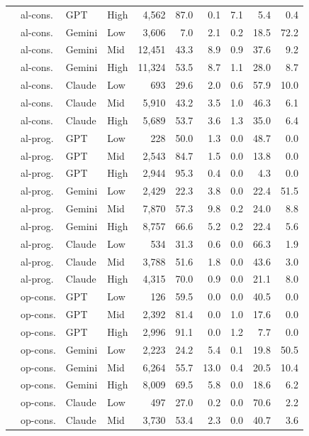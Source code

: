 \begin{table}[t]
\begin{tabular}{llllrrrrrr}
 & al-cons. & GPT & High & 4{,}562 & 87.0 & 0.1 & 7.1 & 5.4 & 0.4 \\
 & al-cons. & Gemini & Low & 3{,}606 & 7.0 & 2.1 & 0.2 & 18.5 & 72.2 \\
 & al-cons. & Gemini & Mid & 12{,}451 & 43.3 & 8.9 & 0.9 & 37.6 & 9.2 \\
 & al-cons. & Gemini & High & 11{,}324 & 53.5 & 8.7 & 1.1 & 28.0 & 8.7 \\
 & al-cons. & Claude & Low & 693 & 29.6 & 2.0 & 0.6 & 57.9 & 10.0 \\
 & al-cons. & Claude & Mid & 5{,}910 & 43.2 & 3.5 & 1.0 & 46.3 & 6.1 \\
 & al-cons. & Claude & High & 5{,}689 & 53.7 & 3.6 & 1.3 & 35.0 & 6.4 \\
 & al-prog. & GPT & Low & 228 & 50.0 & 1.3 & 0.0 & 48.7 & 0.0 \\
 & al-prog. & GPT & Mid & 2{,}543 & 84.7 & 1.5 & 0.0 & 13.8 & 0.0 \\
 & al-prog. & GPT & High & 2{,}944 & 95.3 & 0.4 & 0.0 & 4.3 & 0.0 \\
 & al-prog. & Gemini & Low & 2{,}429 & 22.3 & 3.8 & 0.0 & 22.4 & 51.5 \\
 & al-prog. & Gemini & Mid & 7{,}870 & 57.3 & 9.8 & 0.2 & 24.0 & 8.8 \\
 & al-prog. & Gemini & High & 8{,}757 & 66.6 & 5.2 & 0.2 & 22.4 & 5.6 \\
 & al-prog. & Claude & Low & 534 & 31.3 & 0.6 & 0.0 & 66.3 & 1.9 \\
 & al-prog. & Claude & Mid & 3{,}788 & 51.6 & 1.8 & 0.0 & 43.6 & 3.0 \\
 & al-prog. & Claude & High & 4{,}315 & 70.0 & 0.9 & 0.0 & 21.1 & 8.0 \\
 & op-cons. & GPT & Low & 126 & 59.5 & 0.0 & 0.0 & 40.5 & 0.0 \\
 & op-cons. & GPT & Mid & 2{,}392 & 81.4 & 0.0 & 1.0 & 17.6 & 0.0 \\
 & op-cons. & GPT & High & 2{,}996 & 91.1 & 0.0 & 1.2 & 7.7 & 0.0 \\
 & op-cons. & Gemini & Low & 2{,}223 & 24.2 & 5.4 & 0.1 & 19.8 & 50.5 \\
 & op-cons. & Gemini & Mid & 6{,}264 & 55.7 & 13.0 & 0.4 & 20.5 & 10.4 \\
 & op-cons. & Gemini & High & 8{,}009 & 69.5 & 5.8 & 0.0 & 18.6 & 6.2 \\
 & op-cons. & Claude & Low & 497 & 27.0 & 0.2 & 0.0 & 70.6 & 2.2 \\
 & op-cons. & Claude & Mid & 3{,}730 & 53.4 & 2.3 & 0.0 & 40.7 & 3.6 \\

\end{tabular}
\end{table}
